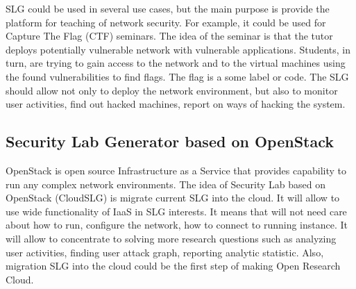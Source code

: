\documentclass{article}
\begin{document}
  SLG could be used in several use cases, but the main purpose is provide the platform for teaching of network security. For example, it could be used for Capture The Flag (CTF) seminars. The idea of the seminar is that the tutor deploys potentially vulnerable network with vulnerable applications. Students, in turn, are trying to gain access to the network and to the virtual machines using the found vulnerabilities to find flags. The flag is a some label or code. The SLG should allow not only to deploy the network environment, but also to monitor user activities, find out hacked machines, report on ways of hacking the system. 



\subsection{Security Lab Generator based on OpenStack}
OpenStack is open source Infrastructure as a Service that provides capability to run any complex network environments. The idea of Security Lab based on OpenStack (CloudSLG) is migrate current SLG into the cloud. It will allow to use wide functionality of IaaS in SLG interests. It means that will not need care about how to run, configure the network, how to connect to running instance. It will allow to concentrate to solving more research questions such as analyzing user activities, finding user attack graph, reporting analytic statistic. Also, migration SLG into the cloud could be the first step of making Open Research Cloud.    
\end{document}
